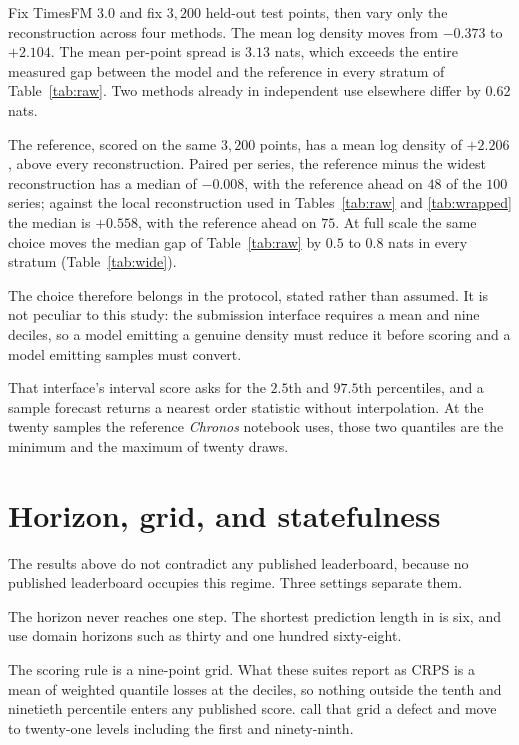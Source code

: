 \documentclass[article]{jss}
\providecommand{\pkg}[1]{\textit{#1}}
\renewcommand{\pkg}[1]{\textit{#1}}
\begin{document}
Fix TimesFM 3.0 and fix $3{,}200$ held-out test points, then vary only the
reconstruction across four methods. The mean log density moves from $-0.373$ to
$+2.104$. The mean per-point spread is $3.13$ nats, which exceeds the entire
measured gap between the model and the reference in every stratum of
Table~\ref{tab:raw}. Two methods already in independent use elsewhere differ by
$0.62$ nats.

The reference, scored on the same $3{,}200$ points, has a mean log density of
$+2.206$, above every reconstruction. Paired per series, the reference minus
the widest reconstruction has a median of $-0.008$, with the reference ahead on
$48$ of the $100$ series; against the local reconstruction used in
Tables~\ref{tab:raw} and \ref{tab:wrapped} the median is $+0.558$, with the
reference ahead on $75$. At full scale the same choice moves the median gap of
Table~\ref{tab:raw} by $0.5$ to $0.8$ nats in every stratum
(Table~\ref{tab:wide}).

The choice therefore belongs in the protocol, stated rather than assumed. It is
not peculiar to this study: the \citet{aksu2024gifteval} submission interface
requires a mean and nine deciles, so a model emitting a genuine density must
reduce it before scoring and a model emitting samples must convert.

That interface's interval score asks for the $2.5$th and $97.5$th percentiles,
and a sample forecast returns a nearest order statistic without interpolation.
At the twenty samples the reference \pkg{Chronos} notebook uses, those two
quantiles are the minimum and the maximum of twenty draws.

\section{Horizon, grid, and statefulness}\label{sec:suites}

The results above do not contradict any published leaderboard, because no
published leaderboard occupies this regime. Three settings separate them.

The horizon never reaches one step. The shortest prediction length in
\citet{aksu2024gifteval} is six, and \citet{shchur2025fevbench} use domain
horizons such as thirty and one hundred sixty-eight.

The scoring rule is a nine-point grid. What these suites report as CRPS is a
mean of weighted quantile losses at the deciles, so nothing outside the tenth
and ninetieth percentile enters any published score.
\citet{ansari2025chronos2} call that grid a defect and move to twenty-one
levels including the first and ninety-ninth.
\end{document}

